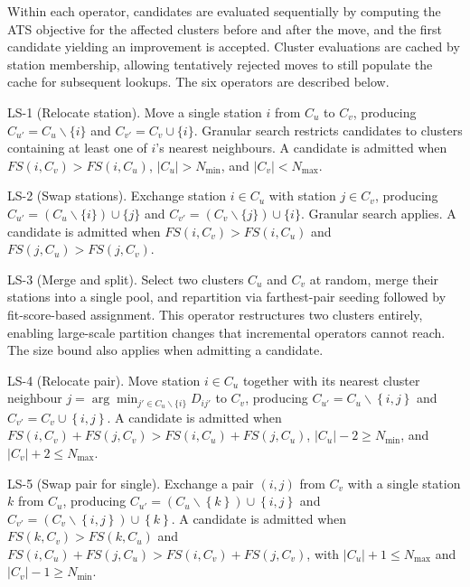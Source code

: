 Within each operator, candidates are evaluated sequentially by computing the ATS objective for the affected clusters before and after the move, and the first candidate yielding an improvement is accepted. Cluster evaluations are cached by station membership, allowing tentatively rejected moves to still populate the cache for subsequent lookups. The six operators are described below.

LS-1 (Relocate station). Move a single station $i$ from ${{C}_{u}}$ to ${{C}_{v}}$, producing ${{C}_{{{u}'}}}={{C}_{u}}\backslash \{i\}$ and ${{C}_{{{v}'}}}={{C}_{v}}\cup \{i\}$. Granular search restricts candidates to clusters containing at least one of $i$'s nearest neighbours. A candidate is admitted when $FS(i,{{C}_{v}})>FS(i,{{C}_{u}})$, $|{{C}_{u}}|>{{N}_{\min }}$, and $|{{C}_{v}}|<{{N}_{\max }}$.

LS-2 (Swap stations). Exchange station $i\in {{C}_{u}}$ with station $j\in {{C}_{v}}$, producing ${{C}_{{{u}'}}}=({{C}_{u}}\backslash \{i\})\cup \{j\}$ and ${{C}_{{{v}'}}}=({{C}_{v}}\backslash \{j\})\cup \{i\}$. Granular search applies. A candidate is admitted when $FS(i,{{C}_{v}})>FS(i,{{C}_{u}})$ and $FS(j,{{C}_{u}})>FS(j,{{C}_{v}})$.

LS-3 (Merge and split). Select two clusters ${{C}_{u}}$ and ${{C}_{v}}$ at random, merge their stations into a single pool, and repartition via farthest-pair seeding followed by fit-score-based assignment. This operator restructures two clusters entirely, enabling large-scale partition changes that incremental operators cannot reach. The size bound also applies when admitting a candidate.

LS-4 (Relocate pair). Move station $i\in {{C}_{u}}$ together with its nearest cluster neighbour $j=\arg {{\min }_{{j}'\in {{C}_{u}}\backslash \{i\}}}{{D}_{i{j}'}}$ to ${{C}_{v}}$, producing ${{C}_{{{u}'}}}={{C}_{u}}\backslash \left\{ i,j \right\}$ and ${{C}_{{{v}'}}}={{C}_{v}}\cup \left\{ i,j \right\}$. A candidate is admitted when $FS(i,{{C}_{v}})+FS(j,{{C}_{v}})>FS(i,{{C}_{u}})+FS(j,{{C}_{u}})$, $|{{C}_{u}}|-2\ge {{N}_{\min }}$, and $|{{C}_{v}}|+2\le {{N}_{\max }}$.

LS-5 (Swap pair for single). Exchange a pair $(i,j)$ from ${{C}_{v}}$ with a single station $k$ from ${{C}_{u}}$, producing ${{C}_{{{u}'}}}=({{C}_{u}}\backslash \left\{ k \right\})\cup \left\{ i,j \right\}$ and ${{C}_{{{v}'}}}=({{C}_{v}}\backslash \left\{ i,j \right\})\cup \left\{ k \right\}$. A candidate is admitted when $FS(k,{{C}_{v}})>FS(k,{{C}_{u}})$ and $FS(i,{{C}_{u}})+FS(j,{{C}_{u}})>FS(i,{{C}_{v}})+FS(j,{{C}_{v}})$, with $|{{C}_{u}}|+1\le {{N}_{\max }}$ and $|{{C}_{v}}|-1\ge {{N}_{\min }}$.

